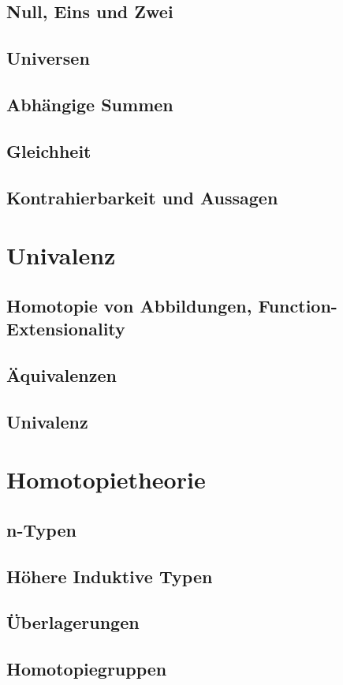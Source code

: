 \documentclass[a4paper,12pt]{article}
\theoremstyle{break}
\theoremstyle{nonumberbreak}
\theoremstyle{nonumberplain}
\begin{document}
\subsection{Null, Eins und Zwei}
\subsection{Universen}
\subsection{Abhängige Summen}
\subsection{Gleichheit}
\subsection{Kontrahierbarkeit und Aussagen}

\section{Univalenz}
\subsection{Homotopie von Abbildungen, Function-Extensionality}
\subsection{Äquivalenzen}
\subsection{Univalenz}

\section{Homotopietheorie}
\subsection{n-Typen}
\subsection{Höhere Induktive Typen}
\subsection{Überlagerungen}
\subsection{Homotopiegruppen}

\printindex
\end{document}
